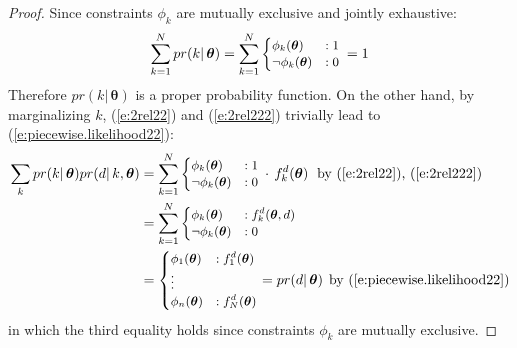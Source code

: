 \begin{proof}
Since constraints $\phi_k$ are mutually exclusive and jointly exhaustive: 
$$\sum_{k= 1}^N pr(k | \, \boldsymbol\theta) = 
\sum_{k=1}^N
{\footnotesize
\begin{cases}
\phi_k(\boldsymbol\theta)   &: 1\\
\neg \phi_k(\boldsymbol\theta)  &: 0
\end{cases}
}%
\, =1
$$
Therefore $pr(k | \, \boldsymbol\theta)$ is a proper probability function. 
On the other hand, by marginalizing $k$, (\ref{e:2rel22}) and (\ref{e:2rel222}) trivially lead to (\ref{e:piecewise.likelihood22}):
{\small 
\begin{align*}
\sum_{k} pr(k | \, \boldsymbol\theta)pr(d | \, k, \boldsymbol\theta) 
&= 
\sum_{k=1}^N  
{\footnotesize
\begin{cases}
\phi_k(\boldsymbol\theta)  &: 1\\
\neg \phi_k(\boldsymbol\theta) &: 0
\end{cases}
}%
\, \cdot \, f^d_k(\boldsymbol \theta)
&&\text{\hspace{-5mm}by (\ref{e:2rel22}), (\ref{e:2rel222})}
\\
&=
\sum_{k=1}^N 
{\footnotesize
\begin{cases}
		\phi_k(\boldsymbol\theta)  &: f^d_k(\boldsymbol\theta, d)\\
\neg 	\phi_k(\boldsymbol\theta)  &: 0
\end{cases}
}%
\nonumber \\
&= {\footnotesize
\begin{cases}
\phi_1(\boldsymbol\theta)  &: f^d_1(\boldsymbol\theta)\\
\vdots\\
\phi_n(\boldsymbol\theta)  &: f^d_N(\boldsymbol\theta)
\end{cases}
}%
= pr(d | \, \boldsymbol\theta) 
&&\text{\hspace{-2mm}by (\ref{e:piecewise.likelihood22})}
\end{align*}}
in which the third equality holds since constraints $\phi_k$ are mutually exclusive. 
\end{proof}
 

